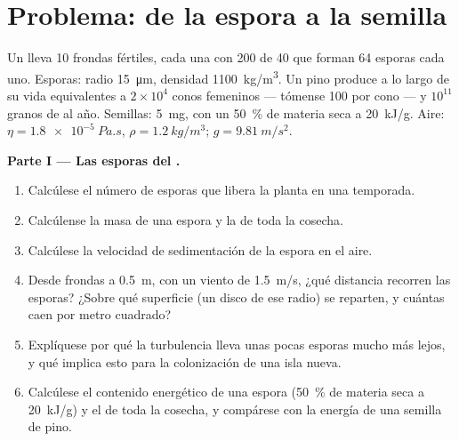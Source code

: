 \section{Problema: de la espora a la semilla}

\begin{problem}
\label{pb:b2:plant-life-cycles:1}
Un  lleva \num{10} frondas fértiles, cada una con \num{200}
 de \num{40}  que forman \num{64} esporas cada uno.
Esporas: radio \qty{15}{\micro m}, densidad \qty{1100}{kg/m^3}. Un pino
produce a lo largo de su vida  equivalentes a $2\times 10^{4}$ conos
femeninos ---
tómense \num{100}  por cono --- y $10^{11}$ granos de 
al año. Semillas: \qty{5}{mg}, con un \qty{50}{\%} de materia seca a
\qty{20}{kJ/g}. Aire: $\eta = \qty{1.8e-5}{Pa.s}$, $\rho =
\qty{1.2}{kg/m^3}$; $g = \qty{9.81}{m/s^2}$.

\medskip
\noindent\textbf{Parte I --- Las esporas del .}
\begin{enumerate}
  \item Calcúlese el número de esporas que libera la planta en una
        temporada.
  \item Calcúlense la masa de una espora y la de toda la cosecha.
  \item Calcúlese la velocidad de sedimentación de la espora en el aire.
  \item Desde frondas a \qty{0.5}{m}, con un viento de \qty{1.5}{m/s},
        ¿qué distancia recorren las esporas? ¿Sobre qué superficie (un
        disco de ese radio) se reparten, y cuántas caen por metro
        cuadrado?
  \item Explíquese por qué la turbulencia lleva unas pocas esporas mucho
        más lejos, y qué implica esto para la colonización de una isla
        nueva.
  \item Calcúlese el contenido energético de una espora (\qty{50}{\%} de
        materia seca a \qty{20}{kJ/g}) y el de toda la cosecha, y
        compárese con la energía de una semilla de pino.
\end{enumerate}


\end{problem}
